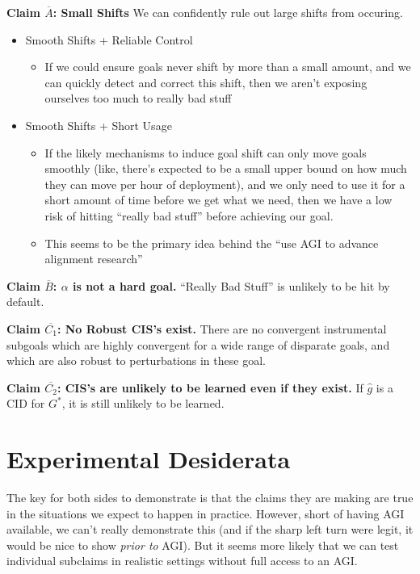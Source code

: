\documentclass{article}
\begin{document}
\textbf{Claim $\overline{A}$: Small Shifts} We can confidently rule out large shifts from occuring.
\begin{itemize}
    \item Smooth Shifts + Reliable Control
    \begin{itemize}
        \item If we could ensure goals never shift by more than a small amount, and we can quickly detect and correct this shift, then we aren’t exposing ourselves too much to really bad stuff
    \end{itemize}
    \item Smooth Shifts + Short Usage
    \begin{itemize}
        \item If the likely mechanisms to induce goal shift can only move goals smoothly (like, there’s expected to be a small upper bound on how much they can move per hour of deployment), and we only need to use it for a short amount of time before we get what we need, then we have a low risk of hitting “really bad stuff” before achieving our goal.
        \item This seems to be the primary idea behind the “use AGI to advance alignment research”
    \end{itemize}
\end{itemize}

\textbf{Claim $\overline{B}$: $\alpha$ is not a hard goal.} “Really Bad Stuff” is unlikely to be hit by default.

\textbf{Claim $\overline{C_1}$: No Robust CIS's exist.} There are no convergent instrumental subgoals which are highly convergent for a wide range of disparate goals, and which are also robust to perturbations in these goal.

\textbf{Claim $\overline{C_2}$: CIS's are unlikely to be learned even if they exist.} If $\hat{g}$ is a CID for $G^*$, it is still unlikely to be learned.

\section{Experimental Desiderata}
The key for both sides to demonstrate is that the claims they are making are true in the situations we expect to happen in practice. However, short of having AGI available, we can’t really demonstrate this (and if the sharp left turn were legit, it would be nice to show \emph{prior to} AGI). But it seems more likely that we can test individual subclaims in realistic settings without full access to an AGI. 
\end{document}
